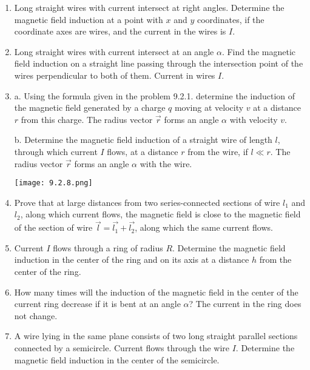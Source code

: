 \documentclass{article}
\begin{document}
\begin{enumerate}[label=9.2.\arabic*]
\item Long straight wires with current intersect at right angles. Determine the magnetic field induction at a point with $x$ and $y$ coordinates, if the coordinate axes are wires, and the current in the wires is $I$.

\item Long straight wires with current intersect at an angle $\alpha$. Find the magnetic field induction on a straight line passing through the intersection point of the wires perpendicular to both of them. Current in wires $I$.

\item a. Using the formula given in the problem 9.2.1. determine the induction of the magnetic field generated by a charge $q$ moving at velocity $v$ at a distance $r$ from this charge. The radius vector $\overrightarrow{r}$ forms an angle $\alpha$ with velocity $v$.

b. Determine the magnetic field induction of a straight wire of length $l$, through which current $I$ flows, at a distance $r$ from the wire, if $l \ll r$. The radius vector $\overrightarrow{r}$ forms an angle $\alpha$ with the wire.

\begin{center}
    \texttt{[image: 9.2.8.png]}
\end{center}

\item Prove that at large distances from two series-connected sections of wire $l_1$ and $l_2$, along which current flows, the magnetic field is close to the magnetic field of the section of wire $\overrightarrow{l} = \overrightarrow{l_1} + \overrightarrow{l_2}$, along which the same current flows.

\item Current $I$ flows through a ring of radius $R$. Determine the magnetic field induction in the center of the ring and on its axis at a distance $h$ from the center of the ring.

\item How many times will the induction of the magnetic field in the center of the current ring decrease if it is bent at an angle $\alpha$? The current in the ring does not change.

\item A wire lying in the same plane consists of two long straight parallel sections connected by a semicircle. Current flows through the wire $I$. Determine the magnetic field induction in the center of the semicircle.


\end{enumerate}
\end{document}
